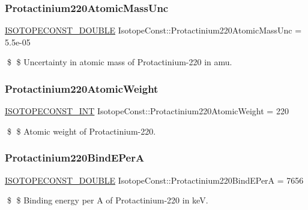\subsubsection{\texorpdfstring{Protactinium220\+Atomic\+Mass\+Unc}{Protactinium220AtomicMassUnc}}
{\footnotesize\ttfamily \mbox{\hyperlink{group___isotope_const-_macros_ga8f45a7272ce02c0b4c65c44636ed719a}{I\+S\+O\+T\+O\+P\+E\+C\+O\+N\+S\+T\+\_\+\+D\+O\+U\+B\+LE}} Isotope\+Const\+::\+Protactinium220\+Atomic\+Mass\+Unc = 5.\+5e-\/05}

\$ \$ Uncertainty in atomic mass of Protactinium-\/220 in amu. \mbox{\label{group___isotope_const-_protactinium-_pa220_ga6baff025b83635dda0ffeaa277472b50}} 
\subsubsection{\texorpdfstring{Protactinium220\+Atomic\+Weight}{Protactinium220AtomicWeight}}
{\footnotesize\ttfamily \mbox{\hyperlink{group___isotope_const-_macros_ga5f18360b3e99483a35c32d789e62621c}{I\+S\+O\+T\+O\+P\+E\+C\+O\+N\+S\+T\+\_\+\+I\+NT}} Isotope\+Const\+::\+Protactinium220\+Atomic\+Weight = 220}

\$ \$ Atomic weight of Protactinium-\/220. \mbox{\label{group___isotope_const-_protactinium-_pa220_ga51b502dcd3128c365352177bae7dabcb}} 
\subsubsection{\texorpdfstring{Protactinium220\+Bind\+E\+PerA}{Protactinium220BindEPerA}}
{\footnotesize\ttfamily \mbox{\hyperlink{group___isotope_const-_macros_ga8f45a7272ce02c0b4c65c44636ed719a}{I\+S\+O\+T\+O\+P\+E\+C\+O\+N\+S\+T\+\_\+\+D\+O\+U\+B\+LE}} Isotope\+Const\+::\+Protactinium220\+Bind\+E\+PerA = 7656}

\$ \$ Binding energy per A of Protactinium-\/220 in keV. \mbox{\label{group___isotope_const-_protactinium-_pa220_gac1d0fbac9d4df672a5ef49ac1853b514}} 
